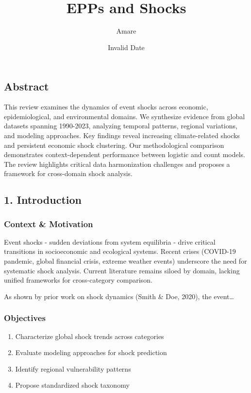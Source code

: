 \documentclass[
]{article}
\title{EPPs and Shocks}
\author{Amare}
\date{Invalid Date}
\begin{document}
\maketitle


\subsection{Abstract}\label{abstract}

This review examines the dynamics of event shocks across economic,
epidemiological, and environmental domains. We synthesize evidence from
global datasets spanning 1990-2023, analyzing temporal patterns,
regional variations, and modeling approaches. Key findings reveal
increasing climate-related shocks and persistent economic shock
clustering. Our methodological comparison demonstrates context-dependent
performance between logistic and count models. The review highlights
critical data harmonization challenges and proposes a framework for
cross-domain shock analysis.

\subsection{1. Introduction}\label{introduction}

\subsubsection{Context \& Motivation}\label{context-motivation}

Event shocks - sudden deviations from system equilibria - drive critical
transitions in socioeconomic and ecological systems. Recent crises
(COVID-19 pandemic, global financial crisis, extreme weather events)
underscore the need for systematic shock analysis. Current literature
remains siloed by domain, lacking unified frameworks for cross-category
comparison.

As shown by prior work on shock dynamics (Smith \& Doe, 2020), the
event\ldots{}

\subsubsection{Objectives}\label{objectives}

\begin{enumerate}
\def\labelenumi{\arabic{enumi}.}
\item
  Characterize global shock trends across categories
\item
  Evaluate modeling approaches for shock prediction
\item
  Identify regional vulnerability patterns
\item
  Propose standardized shock taxonomy
\end{enumerate}
\end{document}
